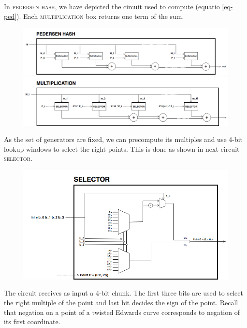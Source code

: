 In \textsc{pedersen hash}, we have depicted the circuit used to compute (equatio \ref{eq-ped}). Each \textsc{multiplication} box returns one term of the sum. 

\begin{figure}[h]
	\centering
	\includegraphics[scale=0.4]{Diag/Ped_Hash.png}
	\includegraphics[scale=0.4]{Diag/Ped_Hash_Multiplication.png}
\end{figure}

As the set of generators are fixed, we can precompute its multiples and use 4-bit lookup windows to select the right points. This is done as shown in next circuit \textsc{selector}.

\begin{figure}[h]
	\centering
	\includegraphics[scale=0.5]{Diag/Ped_Hash_Multiplication_selector.png}
\end{figure}

The circuit receives as input a 4-bit chunk. The first three bits are used to select the right multiple of the point and last bit decides the sign of the point. Recall that negation on a point of a twisted Edwards curve corresponds to negation of its first coordinate. 